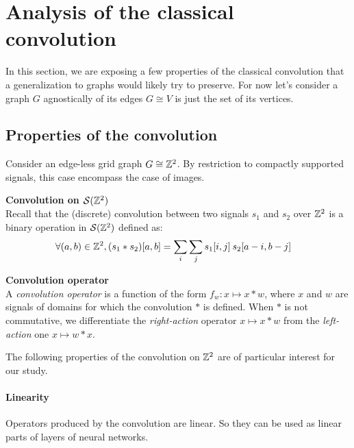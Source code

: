 \section{Analysis of the classical convolution}
\label{sec:2.1}

In this section, we are exposing a few properties of the classical convolution that a generalization to graphs would likely try to preserve. For now let's consider a graph $G$ agnostically of its edges \ie $G \cong V$ is just the set of its vertices.

\subsection{Properties of the convolution}

Consider an edge-less grid graph \ie $G \cong \bbz^2$. By restriction to compactly supported signals, this case encompass the case of images.

\begin{definition}\textbf{Convolution on $\cs(\bbz^2)$}\\
Recall that the (discrete) convolution between two signals $s_1$ and $s_2$ over $\bbz^2$ is a binary operation in $\cs(\bbz^2)$ defined as:
\begin{align*}
\forall (a,b) \in \bbz^2, (s_1 \ast s_2) [a,b] & = \displaystyle \sum_i \sum_j s_1[i,j] \h{2} s_2[a-i, b-j]
\end{align*}
\end{definition}

\begin{definition}\textbf{Convolution operator}\\
A \emph{convolution operator} is a function of the form $f_w: x \mapsto x \ast w$, where $x$ and $w$ are signals of domains for which the convolution $\ast$ is defined. When $\ast$ is not commutative, we differentiate the \emph{right-action} operator $x \mapsto x \ast w$ from the \emph{left-action} one $x \mapsto w \ast x$.
\end{definition}

The following properties of the convolution on $\bbz^2$ are of particular interest for our study.

\paragraph{Linearity}
Operators produced by the convolution are linear. So they can be used as linear parts of layers of neural networks.


